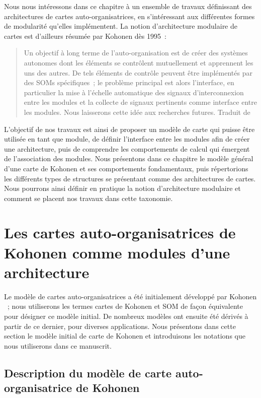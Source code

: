 \documentclass[../main]{subfiles}
\begin{document}
Nous nous intéressons dans ce chapitre à un ensemble de travaux définissant des architectures de cartes auto-organisatrices, en s'intéressant aux différentes formes de modularité qu'elles implémentent.
La notion d'architecture modulaire de cartes est d'ailleurs résumée par Kohonen dès 1995~:
\begin{quote}
Un objectif à long terme de l'auto-organisation est de créer des systèmes autonomes dont les éléments se contrôlent mutuellement et apprennent les uns des autres. De tels éléments de contrôle peuvent être implémentés par des SOMs spécifiques~; le problème principal est alors l'interface, en particulier la mise à l'échelle automatique des signaux d'interconnexion entre les modules et la collecte de signaux pertinents comme interface entre les modules. Nous laisserons cette idée aux recherches futures.
Traduit de \cite{Kohonen1995SelfOrganizingM}
\end{quote}

L'objectif de nos travaux est ainsi de proposer un modèle de carte qui puisse être utilisée en tant que module, de définir l'interface entre les modules afin de créer une architecture, puis de comprendre les comportements de calcul qui émergent de l'association des modules.
Nous présentons dans ce chapitre le modèle général d'une carte de Kohonen et ses comportements fondamentaux, puis répertorions les différents types de structures se présentant comme des architectures de cartes. Nous pourrons ainsi définir en pratique la notion d'architecture modulaire et comment se placent nos travaux dans cette taxonomie.

\section{Les cartes auto-organisatrices de Kohonen comme modules d'une architecture}\label{sec:som001}

Le modèle de cartes auto-organisatrices a été initialement développé par Kohonen \parencite{Kohonen1982}~; nous utiliserons les termes cartes de Kohonen et SOM de façon équivalente pour désigner ce modèle initial.
De nombreux modèles ont ensuite été dérivés à partir de ce dernier, pour diverses applications.
Nous présentons dans cette section le modèle initial de carte de Kohonen et introduisons les notations que nous utiliserons dans ce manuscrit.

\subsection{Description du modèle de carte auto-organisatrice de Kohonen}\label{sec:modele_som}
\end{document}
